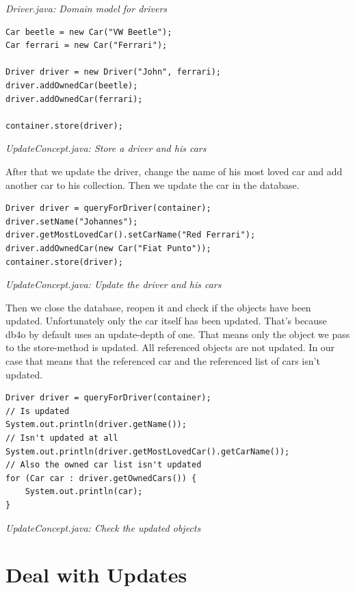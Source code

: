 {\small\itshape Driver.java: Domain model for drivers\par}
\medskip

\begin{lstlisting}
Car beetle = new Car("VW Beetle");
Car ferrari = new Car("Ferrari");

Driver driver = new Driver("John", ferrari);
driver.addOwnedCar(beetle);
driver.addOwnedCar(ferrari);

container.store(driver);
\end{lstlisting}

{\small\itshape UpdateConcept.java: Store a driver and his cars\par}
\medskip

After that we update the driver, change the name of his most loved car and add another car to his collection. Then we update the car in the database.

\begin{lstlisting}
Driver driver = queryForDriver(container);
driver.setName("Johannes");
driver.getMostLovedCar().setCarName("Red Ferrari");
driver.addOwnedCar(new Car("Fiat Punto"));
container.store(driver);
\end{lstlisting}

{\small\itshape UpdateConcept.java: Update the driver and his cars\par}
\medskip

Then we close the database, reopen it and check if the objects have been updated. Unfortunately only the car itself has been updated. That's because db4o by default uses an update-depth of one. That means only the object we pass to the store-method is updated. All referenced objects are not updated. In our case that means that the referenced car and the referenced list of cars isn't updated.

\begin{lstlisting}
Driver driver = queryForDriver(container);
// Is updated
System.out.println(driver.getName());
// Isn't updated at all
System.out.println(driver.getMostLovedCar().getCarName());
// Also the owned car list isn't updated
for (Car car : driver.getOwnedCars()) {
    System.out.println(car);
}
\end{lstlisting}

{\small\itshape UpdateConcept.java: Check the updated objects\par}
\medskip

\section{Deal with Updates}
\label{tut:update-concept:dealwithit}

